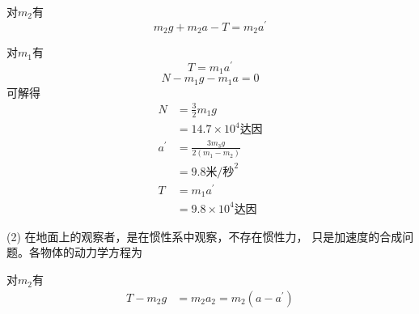 对$ m_2 $有\vspace{-1.9em}
\begin{equation*}
    m _ { 2 } g + m _ { 2 } a - T = m _ { 2 } a ^ { \prime }
\end{equation*}

对$ m_1 $有\vspace{-1.85em}
\begin{equation*}
    T = m _ { 1 } a ^ { \prime }
\end{equation*}
\begin{equation*}
    N - m _ { 1 } g - m _ { 1 } a = 0
\end{equation*}
可解得
\begin{align*}
    N &= \frac { 3 } { 2 } m _ { 1 } g  \\
      &= 1 4 . 7 \times 1 0 ^ { 4 } \text{达因} \\
    a ^ { \prime } &= \frac { 3 m _ { 3 } g } { 2 \left( m _ { 1 } - m _ { 2 } \right) } \\
      &= 9 . 8  \text{米/秒} ^ 2 \\
    T &= m _ { 1 } a ^ { \prime } \\
      &= 9 . 8 \times 1 0 ^ { 4 } \text{达因}
\end{align*}

(2) 在地面上的观察者，是在惯性系中观察，不存在惯性力，
只是加速度的合成问题。各物体的动力学方程为

对$ m_2 $有\vspace{-1.4em}
\begin{align*}
    T - m _ { 2 } g &= m _ { 2 } a _ { 2 } = m _ { 2 } \left( a - a ^ { \prime } \right)
\end{align*}

